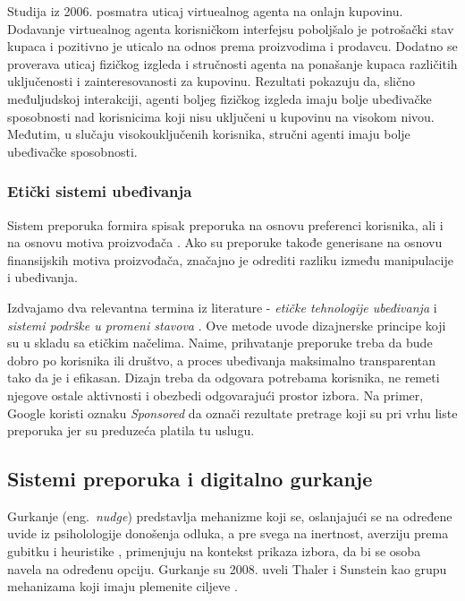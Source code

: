 Studija iz 2006. \cite{Holzwarth_Janiszewski_Neumann_2006} posmatra uticaj virtuealnog agenta na onlajn kupovinu. Dodavanje virtuealnog agenta korisničkom interfejsu poboljšalo je potrošački stav kupaca i pozitivno je uticalo na odnos prema proizvodima i prodavcu. Dodatno se proverava uticaj fizičkog izgleda i stručnosti agenta na ponašanje kupaca različitih uključenosti i zainteresovanosti za kupovinu. Rezultati pokazuju da, slično međuljudskoj interakciji, agenti boljeg fizičkog izgleda imaju bolje ubeđivačke sposobnosti nad korisnicima koji nisu uključeni u kupovinu na visokom nivou. Međutim, u slučaju visokouključenih korisnika, stručni agenti imaju bolje ubeđivačke sposobnosti.


\subsubsection{Etički sistemi ubeđivanja}
Sistem preporuka formira spisak preporuka na osnovu preferenci korisnika, ali i na osnovu motiva proizvođača \cite{Yoo_Gretzel_Zanker_2013}. Ako su preporuke takođe generisane na osnovu finansijskih motiva proizvođača, značajno je odrediti razliku između manipulacije i ubeđivanja. 

Izdvajamo dva relevantna termina iz literature - {\it etičke tehnologije ubeđivanja} \cite{Benner_2022} i {\it sistemi podrške u promeni stavova} \cite{Karppinen_Oinas-Kukkonen_2013}. Ove metode uvode dizajnerske principe koji su u skladu sa etičkim načelima. Naime, prihvatanje preporuke treba da bude dobro po korisnika ili društvo, a proces ubeđivanja maksimalno transparentan tako da je i efikasan. Dizajn treba da odgovara potrebama korisnika, ne remeti njegove ostale aktivnosti i obezbedi odgovarajući prostor izbora. Na primer, Google koristi oznaku {\it Sponsored} da označi rezultate pretrage koji su pri vrhu liste preporuka jer su preduzeća platila tu uslugu.

\subsection{Sistemi preporuka i digitalno gurkanje }
Gurkanje (eng.~{\em nudge}) predstavlja mehanizme koji se, oslanjajući se na određene uvide iz psiholologije donošenja odluka, a pre svega na inertnost, averziju prema gubitku i heuristike \cite{Thaler_Sunstein_2008}, primenjuju na kontekst prikaza izbora, da bi se osoba navela na određenu opciju. Gurkanje su 2008. uveli Thaler i Sunstein kao grupu mehanizama koji imaju plemenite ciljeve \cite{Jesse_Jannach_2021}.

